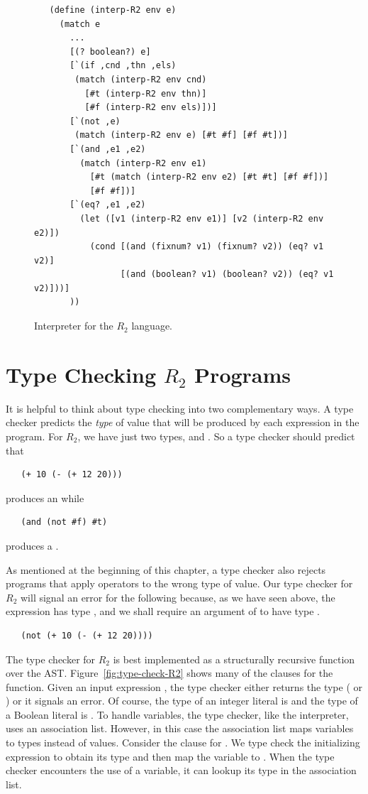 \documentclass[11pt]{book}
\begin{document}
\begin{figure}[tbp]
\begin{lstlisting}
   (define (interp-R2 env e)
     (match e
       ...
       [(? boolean?) e]
       [`(if ,cnd ,thn ,els)
        (match (interp-R2 env cnd)
          [#t (interp-R2 env thn)]
          [#f (interp-R2 env els)])]
       [`(not ,e)
        (match (interp-R2 env e) [#t #f] [#f #t])]
       [`(and ,e1 ,e2)
         (match (interp-R2 env e1)
           [#t (match (interp-R2 env e2) [#t #t] [#f #f])]
           [#f #f])]
       [`(eq? ,e1 ,e2)
         (let ([v1 (interp-R2 env e1)] [v2 (interp-R2 env e2)])
           (cond [(and (fixnum? v1) (fixnum? v2)) (eq? v1 v2)]
                 [(and (boolean? v1) (boolean? v2)) (eq? v1 v2)]))]
       ))
\end{lstlisting}
\caption{Interpreter for the $R_2$ language.}
\label{fig:interp-R2}
\end{figure}


\section{Type Checking $R_2$ Programs}
\label{sec:type-check-r2}

It is helpful to think about type checking into two complementary
ways. A type checker predicts the \emph{type} of value that will be
produced by each expression in the program.  For $R_2$, we have just
two types,  and . So a type checker should
predict that
\begin{lstlisting}
   (+ 10 (- (+ 12 20)))
\end{lstlisting}
produces an  while
\begin{lstlisting}
   (and (not #f) #t)
\end{lstlisting}
produces a .

As mentioned at the beginning of this chapter, a type checker also
rejects programs that apply operators to the wrong type of value. Our
type checker for $R_2$ will signal an error for the following because,
as we have seen above, the expression  has type
, and we shall require an argument of  to have
type .
\begin{lstlisting}
   (not (+ 10 (- (+ 12 20))))
\end{lstlisting}

The type checker for $R_2$ is best implemented as a structurally
recursive function over the AST. Figure~\ref{fig:type-check-R2} shows
many of the clauses for the  function.  Given an
input expression , the type checker either returns the type
( or ) or it signals an error.  Of course,
the type of an integer literal is  and the type of a
Boolean literal is .  To handle variables, the type
checker, like the interpreter, uses an association list. However, in
this case the association list maps variables to types instead of
values. Consider the clause for .  We type check the
initializing expression to obtain its type  and then map the
variable  to . When the type checker encounters the
use of a variable, it can lookup its type in the association list.
\end{document}
